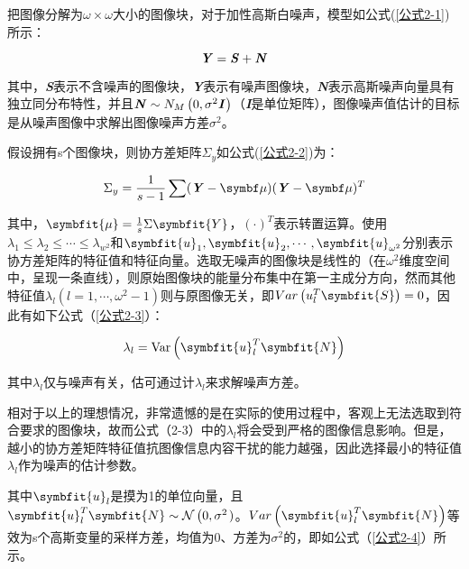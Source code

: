 把图像分解为$\omega \times \omega$大小的图像块，对于加性高斯白噪声，模型如公式(\ref{公式2-1})所示：


\begin{equation}\label{公式2-1}
	\textbf{\emph{Y}} = \textbf{\emph{S}} + \textbf{\emph{N}}
\end{equation}


其中，\textbf{\emph{S}}表示不含噪声的图像块，\textbf{\emph{Y}}表示有噪声图像块，\textbf{\emph{N}}表示高斯噪声向量具有独立同分布特性，并且$\textbf{\textit{N}} \sim N _{ M }\left( 0 , \sigma^{2} \textbf{\textit{I}} \right)$（\textbf{\emph{I}}是单位矩阵），图像噪声值估计的目标是从噪声图像中求解出图像噪声方差$\sigma^2$。

假设拥有s个图像块，则协方差矩阵$\Sigma_y$如公式(\ref{公式2-2})为：

\begin{equation}\label{公式2-2}
	\Sigma_{y}=\frac{1}{s-1} \sum(\textbf{\textit{Y}}-\bm{\emph{$\mu$}})(\textbf{\textit{Y}}-\bm{\emph{$\mu$}})^{T}
\end{equation}


其中，$\symbfit{\mu}=\frac{1}{s}\Sigma\symbfit{Y}$，$\left(\cdot\right)^T$表示转置运算。使用$\lambda_1\le\lambda_2\le\cdots\le\lambda_{w^2}$和$\symbfit{u}_1,\symbfit{u}_2,\cdots,\symbfit{u}_{\omega^2}$分别表示协方差矩阵的特征值和特征向量。选取无噪声的图像块是线性的（在$\omega^2$维度空间中，呈现一条直线），则原始图像块的能量分布集中在第一主成分方向，然而其他特征值$\lambda_l(l=1,\cdots,\omega^2-1)$则与原图像无关，即$Var\left(u_l^T\symbfit{S}\right)=0$，因此有如下公式（\ref{公式2-3}）：

\begin{equation}\label{公式2-3}
	\lambda_{l}=\operatorname{Var}\left(\symbfit{u}_{l}^{T} \symbfit{N}\right)
\end{equation}

其中$\lambda_l$仅与噪声有关，估可通过计$\lambda_l$来求解噪声方差。

相对于以上的理想情况，非常遗憾的是在实际的使用过程中，客观上无法选取到符合要求的图像块，故而公式（2-3）中的$\lambda_l$将会受到严格的图像信息影响。但是，越小的协方差矩阵特征值抗图像信息内容干扰的能力越强，因此选择最小的特征值$\lambda_l$作为噪声的估计参数。

其中$\symbfit{u}_l$是摸为1的单位向量，且$\symbfit{u}_l^T\symbfit{N}\sim\mathcal{N}\left({0},\sigma^2\right.)$。$Var\left(\symbfit{u}_l^T\symbfit{N}\right)$等效为s个高斯变量的采样方差，均值为0、方差为$\sigma^2$的，即如公式（\ref{公式2-4}）所示。

